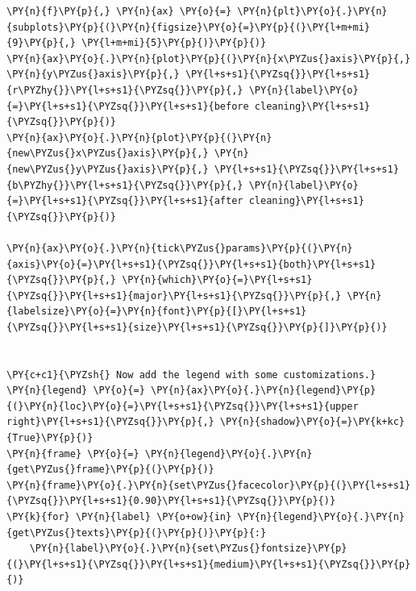 \begin{tcolorbox}[breakable, size=fbox, boxrule=1pt, pad at break*=1mm,colback=cellbackground, colframe=cellborder]
\begin{Verbatim}[commandchars=\\\{\}]
\PY{n}{f}\PY{p}{,} \PY{n}{ax} \PY{o}{=} \PY{n}{plt}\PY{o}{.}\PY{n}{subplots}\PY{p}{(}\PY{n}{figsize}\PY{o}{=}\PY{p}{(}\PY{l+m+mi}{9}\PY{p}{,} \PY{l+m+mi}{5}\PY{p}{)}\PY{p}{)}
\PY{n}{ax}\PY{o}{.}\PY{n}{plot}\PY{p}{(}\PY{n}{x\PYZus{}axis}\PY{p}{,} \PY{n}{y\PYZus{}axis}\PY{p}{,} \PY{l+s+s1}{\PYZsq{}}\PY{l+s+s1}{r\PYZhy{}}\PY{l+s+s1}{\PYZsq{}}\PY{p}{,} \PY{n}{label}\PY{o}{=}\PY{l+s+s1}{\PYZsq{}}\PY{l+s+s1}{before cleaning}\PY{l+s+s1}{\PYZsq{}}\PY{p}{)}
\PY{n}{ax}\PY{o}{.}\PY{n}{plot}\PY{p}{(}\PY{n}{new\PYZus{}x\PYZus{}axis}\PY{p}{,} \PY{n}{new\PYZus{}y\PYZus{}axis}\PY{p}{,} \PY{l+s+s1}{\PYZsq{}}\PY{l+s+s1}{b\PYZhy{}}\PY{l+s+s1}{\PYZsq{}}\PY{p}{,} \PY{n}{label}\PY{o}{=}\PY{l+s+s1}{\PYZsq{}}\PY{l+s+s1}{after cleaning}\PY{l+s+s1}{\PYZsq{}}\PY{p}{)}

\PY{n}{ax}\PY{o}{.}\PY{n}{tick\PYZus{}params}\PY{p}{(}\PY{n}{axis}\PY{o}{=}\PY{l+s+s1}{\PYZsq{}}\PY{l+s+s1}{both}\PY{l+s+s1}{\PYZsq{}}\PY{p}{,} \PY{n}{which}\PY{o}{=}\PY{l+s+s1}{\PYZsq{}}\PY{l+s+s1}{major}\PY{l+s+s1}{\PYZsq{}}\PY{p}{,} \PY{n}{labelsize}\PY{o}{=}\PY{n}{font}\PY{p}{[}\PY{l+s+s1}{\PYZsq{}}\PY{l+s+s1}{size}\PY{l+s+s1}{\PYZsq{}}\PY{p}{]}\PY{p}{)}


\PY{c+c1}{\PYZsh{} Now add the legend with some customizations.}
\PY{n}{legend} \PY{o}{=} \PY{n}{ax}\PY{o}{.}\PY{n}{legend}\PY{p}{(}\PY{n}{loc}\PY{o}{=}\PY{l+s+s1}{\PYZsq{}}\PY{l+s+s1}{upper right}\PY{l+s+s1}{\PYZsq{}}\PY{p}{,} \PY{n}{shadow}\PY{o}{=}\PY{k+kc}{True}\PY{p}{)}
\PY{n}{frame} \PY{o}{=} \PY{n}{legend}\PY{o}{.}\PY{n}{get\PYZus{}frame}\PY{p}{(}\PY{p}{)}
\PY{n}{frame}\PY{o}{.}\PY{n}{set\PYZus{}facecolor}\PY{p}{(}\PY{l+s+s1}{\PYZsq{}}\PY{l+s+s1}{0.90}\PY{l+s+s1}{\PYZsq{}}\PY{p}{)}
\PY{k}{for} \PY{n}{label} \PY{o+ow}{in} \PY{n}{legend}\PY{o}{.}\PY{n}{get\PYZus{}texts}\PY{p}{(}\PY{p}{)}\PY{p}{:}
    \PY{n}{label}\PY{o}{.}\PY{n}{set\PYZus{}fontsize}\PY{p}{(}\PY{l+s+s1}{\PYZsq{}}\PY{l+s+s1}{medium}\PY{l+s+s1}{\PYZsq{}}\PY{p}{)}
            

\end{Verbatim}
\end{tcolorbox}
